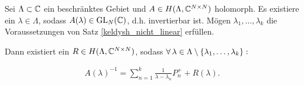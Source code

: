 \begin{corollary} \label{keldysh_multi}

    Sei $\Lambda \subset \mathbb{C}$ ein beschränktes Gebiet und $A \in H(\Lambda, \mathbb{C}^{N \times N})$ holomorph.
    Es existiere ein $\lambda \in \Lambda$, sodass $A(\lambda) \in \operatorname{GL}_N(\mathbb{C})$, d.h. invertierbar ist.
    Mögen $\lambda_1, \dots, \lambda_k$ die Voraussetzungen von Satz \ref{keldysh_nicht_linear} erfüllen.

    Dann existiert ein $R \in H(\Lambda, \mathbb{C}^{N \times N})$, sodass $\forall \, \lambda \in \Lambda \setminus {\left \{ \lambda_1, \dots, \lambda_k \right \}}:$

    \begin{align*}
        A(\lambda)^{-1}
        =
        \sum_{n=1}^k
            \frac{1}{\lambda - \lambda_n} P_n^+
        +
        R(\lambda).
    \end{align*}

\end{corollary}
